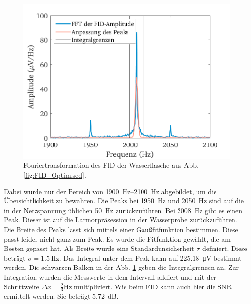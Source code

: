 \documentclass[../main.tex]{subfiles}
\begin{document}
    \begin{figure}[H]
        \centering
        \includegraphics[width=\textwidth]{Bilddateien/7/Part7_Fig_2.png}
        \caption{Fouriertransformation des FID der Wasserflasche aus Abb. \ref{fig:FID_Optimised}.}
        \label{fig:FID_Optimised_FFT}
    \end{figure}
    Dabei wurde nur der Bereich von \SIrange{1900}{2100}{\hertz} abgebildet, um die Übersichtlichkeit zu bewahren. Die Peaks bei \SI{1950}{\hertz} und \SI{2050}{\hertz} sind auf die in der Netzspannung üblichen \SI{50}{\hertz} zurückzuführen. Bei \SI{2008}{\hertz} gibt es einen Peak. Dieser ist auf die Larmorpräzession in der Wasserprobe zurückzuführen. Die Breite des Peaks lässt sich mittels einer Gaußfitfunktion bestimmen. Diese passt leider nicht ganz zum Peak. Es wurde die Fitfunktion gewählt, die am Besten gepasst hat. Als Breite wurde eine Standardunsicherheit $\sigma$ definiert. Diese beträgt $\sigma = \SI{1,5}{\hertz}$. Das Integral unter dem Peak kann auf \SI{225,18}{\micro \volt} bestimmt werden. Die schwarzen Balken in der Abb. \ref{fig:FID_Optimised_FFT} geben die Integralgrenzen an. Zur Integration wurden die Messwerte in dem Intervall addiert und mit der Schrittweite $\Delta x = \frac{2}{3}\si{\hertz}$ multipliziert. Wie beim FID kann auch hier die SNR ermittelt werden. Sie beträgt \SI{5,72}{\deci \bel}.
\end{document}
